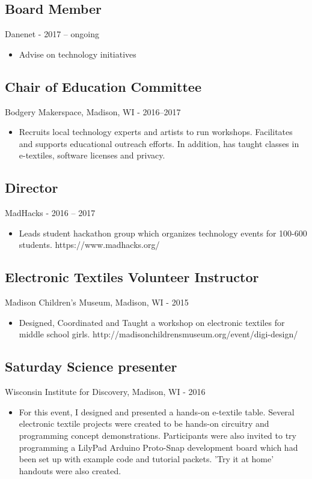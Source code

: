 \documentclass[../main.tex]{subfiles}
\begin{document}

\subsection*{Board Member}
     Danenet - 2017 -- ongoing
\begin{itemize}
		\item{Advise on technology initiatives}
\end{itemize}



\subsection*{Chair of Education Committee}
     Bodgery Makerspace, Madison, WI - 2016--2017
\begin{itemize}
		\item{Recruits local technology experts and artists to run workshops. Facilitates and supports educational outreach efforts. In addition, has taught classes in e-textiles, software licenses and privacy.}
	\end{itemize}

\subsection*{Director}
     MadHacks - 2016 -- 2017
\begin{itemize}
		\item{Leads student hackathon group which organizes technology events for 100-600 students. https://www.madhacks.org/}
	\end{itemize}

\subsection*{Electronic Textiles Volunteer Instructor}
     Madison Children's Museum, Madison, WI - 2015
\begin{itemize}
		\item{Designed, Coordinated and Taught a workshop on electronic textiles for middle school girls. http://madisonchildrensmuseum.org/event/digi-design/}
	\end{itemize}

\subsection*{Saturday Science presenter}
     Wisconsin Institute for Discovery, Madison, WI - 2016
\begin{itemize}
		\item{For this event, I designed and presented a hands-on e-textile table. Several electronic textile projects were created to be hands-on circuitry and programming concept demonstrations. Participants were also invited to try programming a LilyPad Arduino Proto-Snap development board which had been set up with example code and tutorial packets. 'Try it at home' handouts were also created.}
	\end{itemize}
\end{document}
